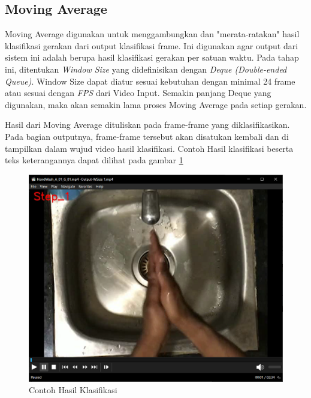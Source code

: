 \subsection{Moving Average}
\label{subsec:movingaverage}

Moving Average digunakan untuk menggambungkan dan "merata-ratakan" hasil klasifikasi gerakan dari output klasifikasi frame. Ini digunakan agar output dari sistem ini adalah berupa hasil klasifikasi gerakan per satuan waktu. Pada tahap ini, ditentukan \textit{Window Size} yang didefinisikan dengan \textit{Deque (Double-ended Queue)}. Window Size dapat diatur sesuai kebutuhan dengan minimal 24 frame atau sesuai dengan \textit{FPS} dari Video Input. Semakin panjang Deque yang digunakan, maka akan semakin lama proses Moving Average pada setiap gerakan. 

Hasil dari Moving Average dituliskan pada frame-frame yang diklasifikasikan. Pada bagian outputnya, frame-frame tersebut akan disatukan kembali dan di tampilkan dalam wujud video hasil klasifikasi. Contoh Hasil klasifikasi beserta teks keterangannya dapat dilihat pada gambar \ref{fig:contohhasil}
\begin{figure}[!ht]
	\centering
	\includegraphics[width=0.9\columnwidth]{gambar/contohhasilklasifikasi.png}
	\caption{Contoh Hasil Klasifikasi}
	\label{fig:contohhasil}
\end{figure}
